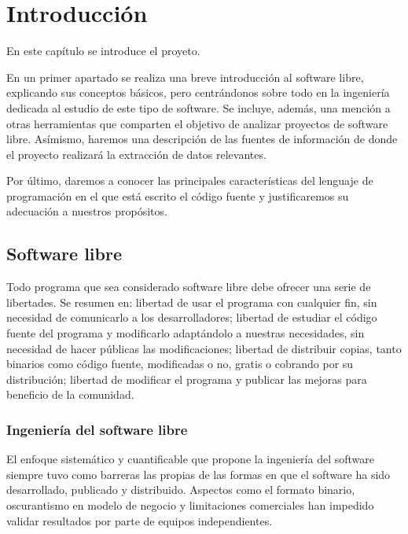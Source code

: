 \chapter{Introducción}
\label{sec:intro} %

En este capítulo se introduce el proyeto.

En un primer apartado se realiza una breve introducción al software libre, explicando
sus conceptos básicos, pero centrándonos sobre todo en la ingeniería
dedicada al estudio de este tipo de software. Se incluye, además, una mención a
otras herramientas que comparten el objetivo de analizar proyectos de software libre.
Asímismo, haremos una descripción de las fuentes de información de donde el proyecto
realizará la extracción de datos relevantes.

Por último, daremos a conocer las principales características del lenguaje de
programación en el que está escrito el código fuente y justificaremos su
adecuación a nuestros propósitos.



\section{Software libre}
\label{sec:software-libre}

Todo programa que sea considerado software libre debe ofrecer una serie de
libertades. Se resumen en:
libertad de usar el programa con cualquier fin,
sin necesidad de comunicarlo a los desarrolladores;
libertad de estudiar el código fuente del programa y modificarlo
adaptándolo a nuestras necesidades, sin necesidad de hacer públicas las
modificaciones;
libertad de distribuir copias, tanto binarios como código fuente,
modificadas o no, gratis o cobrando por su distribución;
libertad de modificar el programa y publicar las mejoras para beneficio
de la comunidad.


\subsection{Ingeniería del software libre}
\label{subsec:SLE}

El enfoque sistemático y cuantificable que propone la ingeniería del software
siempre tuvo como barreras las propias de las formas en que el software ha
sido desarrollado, publicado y distribuido. Aspectos como el formato binario,
oscurantismo en modelo de negocio y limitaciones comerciales han impedido
validar resultados por parte de equipos independientes.

